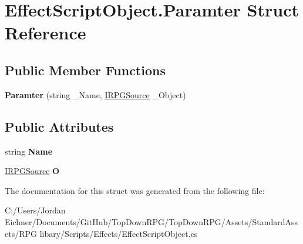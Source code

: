 \hypertarget{struct_effect_script_object_1_1_paramter}{}\section{Effect\+Script\+Object.\+Paramter Struct Reference}
\label{struct_effect_script_object_1_1_paramter}
\subsection*{Public Member Functions}
\begin{DoxyCompactItemize}
\item 
\hypertarget{struct_effect_script_object_1_1_paramter_a399607b1eb0b81283c2580dc1925d2f7}{}{\bfseries Paramter} (string \+\_\+\+Name, \hyperlink{interface_i_r_p_g_source}{I\+R\+P\+G\+Source} \+\_\+\+Object)\label{struct_effect_script_object_1_1_paramter_a399607b1eb0b81283c2580dc1925d2f7}

\end{DoxyCompactItemize}
\subsection*{Public Attributes}
\begin{DoxyCompactItemize}
\item 
\hypertarget{struct_effect_script_object_1_1_paramter_ac64c1d743c49f514f3b9eed444743ca0}{}string {\bfseries Name}\label{struct_effect_script_object_1_1_paramter_ac64c1d743c49f514f3b9eed444743ca0}

\item 
\hypertarget{struct_effect_script_object_1_1_paramter_af4d95eba87dc87bec205b5ee3a9359d7}{}\hyperlink{interface_i_r_p_g_source}{I\+R\+P\+G\+Source} {\bfseries O}\label{struct_effect_script_object_1_1_paramter_af4d95eba87dc87bec205b5ee3a9359d7}

\end{DoxyCompactItemize}


The documentation for this struct was generated from the following file\+:\begin{DoxyCompactItemize}
\item 
C\+:/\+Users/\+Jordan Eichner/\+Documents/\+Git\+Hub/\+Top\+Down\+R\+P\+G/\+Top\+Down\+R\+P\+G/\+Assets/\+Standard\+Assets/\+R\+P\+G libary/\+Scripts/\+Effects/Effect\+Script\+Object.\+cs\end{DoxyCompactItemize}
